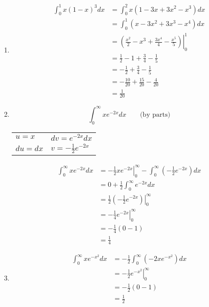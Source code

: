 \documentclass[letterpaper,12pt,fleqn]{article}
\begin{document}
\begin{enumerate}
\begin{enumerate}
  \item
    \begin{align*}
      \int_0^1x(1-x)^3dx &= \int_0^2x(1-3x+3x^2-x^3)dx \\
      &= \int_0^1(x-3x^2+3x^3-x^4)dx \\
      &= \left.\left(\frac{x^2}{2}-x^3+\frac{3x^4}{4}-\frac{x^5}{5}\right)\right\rvert_0^1 \\
      &= \frac{1}{2}-1+\frac{3}{4}-\frac{1}{5} \\
      &= -\frac{1}{2}+\frac{3}{4}-\frac{1}{5} \\
      &= -\frac{10}{20}+\frac{15}{20}-\frac{4}{20} \\
      &= \frac{1}{20}
    \end{align*}

  \item
    \[\int_0^\infty xe^{-2x}dx\qquad\text{(by parts)}\]

    \begin{tabular}{ll}
      \(u=x\) & \(dv=e^{-2x}dx\) \\
      \(du=dx\) & \(v=-\frac{1}{2}e^{-2x}\)
    \end{tabular}

    \begin{align*}
      \int_0^\infty xe^{-2x}dx &=
      \left.-\frac{1}{2}xe^{-2x}\right\lvert_0^\infty-\int_0^\infty\left(-\frac{1}{2}e^{-2x}\right)dx \\
      &= 0 +\frac{1}{2}\int_0^\infty e^{-2x}dx \\
      &= \frac{1}{2}\left.\left(-\frac{1}{2}e^{-2x}\right)\right\rvert_0^\infty \\
      &= -\frac{1}{4}\left.e^{-2x}\right\rvert_0^\infty \\
      &= -\frac{1}{4}(0-1) \\
      &= \frac{1}{4}
    \end{align*}

  \item
    \begin{align*}
      \int_0^\infty xe^{-x^2}dx &= -\frac{1}{2}\int_0^\infty \left(-2xe^{-x^2}\right)dx \\
      &= -\frac{1}{2}\left.e^{-x^2}\right\rvert_0^\infty \\
      &= -\frac{1}{2}(0-1) \\
      &= \frac{1}{2}
    \end{align*}
  \end{enumerate}

\end{enumerate}
\end{document}
